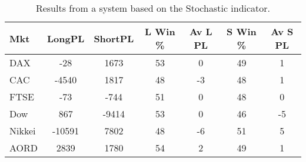\begin{table}[ht]
\centering
\caption[Results from a system based on the Stochastic indicator]{Results from a system based on the Stochastic indicator.} 
\label{tab:stoch_results}
\begin{tabular}{lcccccc}
  \toprule Mkt & LongPL & ShortPL & L Win \% & Av L PL & S Win \% & Av S PL \\ 
  \midrule DAX & -28 & 1673 & 53 & 0 & 49 & 1 \\ 
  CAC & -4540 & 1817 & 48 & -3 & 48 & 1 \\ 
  FTSE & -73 & -744 & 51 & 0 & 48 & 0 \\ 
  Dow & 867 & -9414 & 53 & 0 & 46 & -5 \\ 
  Nikkei & -10591 & 7802 & 48 & -6 & 51 & 5 \\ 
  AORD & 2839 & 1780 & 54 & 2 & 49 & 1 \\ 
   \bottomrule \end{tabular}
\end{table}

